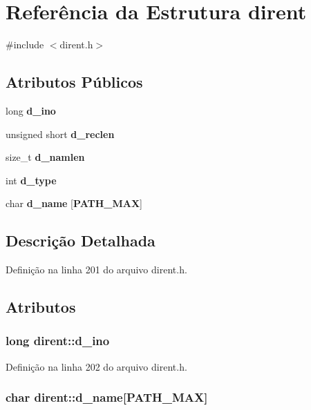 \section{Referência da Estrutura dirent}
\label{structdirent}


{\ttfamily \#include $<$dirent.\+h$>$}

\subsection*{Atributos Públicos}
\begin{DoxyCompactItemize}
\item 
long {\bf d\+\_\+ino}
\item 
unsigned short {\bf d\+\_\+reclen}
\item 
size\+\_\+t {\bf d\+\_\+namlen}
\item 
int {\bf d\+\_\+type}
\item 
char {\bf d\+\_\+name} [{\bf P\+A\+T\+H\+\_\+\+M\+AX}]
\end{DoxyCompactItemize}


\subsection{Descrição Detalhada}


Definição na linha 201 do arquivo dirent.\+h.



\subsection{Atributos}
\subsubsection[{d\+\_\+ino}]{\setlength{\rightskip}{0pt plus 5cm}long dirent\+::d\+\_\+ino}\label{structdirent_acb6fecfb0e0f6fdc226dff8d56c3da4a}


Definição na linha 202 do arquivo dirent.\+h.

\subsubsection[{d\+\_\+name}]{\setlength{\rightskip}{0pt plus 5cm}char dirent\+::d\+\_\+name[{\bf P\+A\+T\+H\+\_\+\+M\+AX}]}\label{structdirent_a6c68ac080755453ec52de202e91de59b}


